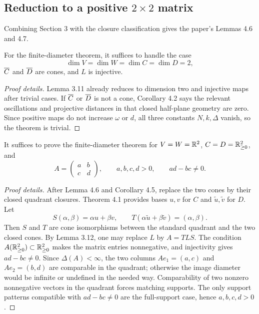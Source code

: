 \subsection{Reduction to a positive $2\times2$ matrix}
Combining Section 3 with the closure classification gives the paper's Lemmas 4.6 and 4.7.

\begin{lemma}
For the finite-diameter theorem, it suffices to handle the case
\[
  \dim V=\dim W=\dim C=\dim D=2,
\]
$\overline{C}$ and $\overline{D}$ are cones, and $L$ is injective.
\end{lemma}

\begin{proof}[Proof details]
Lemma 3.11 already reduces to dimension two and injective maps after trivial cases.
If $\overline{C}$ or $\overline{D}$ is not a cone, Corollary 4.2 says the relevant oscillations and projective distances in that closed half-plane geometry are zero.
Since positive maps do not increase $\omega$ or $d$, all three constants $N,k,\Delta$ vanish, so the theorem is trivial.
\end{proof}

\begin{lemma}
It suffices to prove the finite-diameter theorem for $V=W=\mathbb{R}^2$, $C=D=\mathbb{R}^2_{\ge0}$, and
\[
  A=\begin{pmatrix}a&b\\c&d\end{pmatrix},
  \qquad a,b,c,d>0,
  \qquad ad-bc\ne0.
\]
\end{lemma}

\begin{proof}[Proof details]
After Lemma 4.6 and Corollary 4.5, replace the two cones by their closed quadrant closures.
Theorem 4.1 provides bases $u,v$ for $C$ and $\tilde u,\tilde v$ for $D$.
Let
\[
  S(\alpha,\beta)=\alpha u+\beta v,
  \qquad
  T(\alpha\tilde u+\beta\tilde v)=(\alpha,
\beta).
\]
Then $S$ and $T$ are cone isomorphisms between the standard quadrant and the two closed cones.
By Lemma 3.12, one may replace $L$ by $A=TLS$.
The condition $A(\mathbb{R}^2_{\ge0})\subset\mathbb{R}^2_{\ge0}$ makes the matrix entries nonnegative, and injectivity gives $ad-bc\ne0$.
Since $\Delta(A)<\infty$, the two columns $Ae_1=(a,c)$ and $Ae_2=(b,d)$ are comparable in the quadrant; otherwise the image diameter would be infinite or undefined in the needed way.
Comparability of two nonzero nonnegative vectors in the quadrant forces matching supports.
The only support patterns compatible with $ad-bc\ne0$ are the full-support case, hence $a,b,c,d>0$.
\end{proof}


